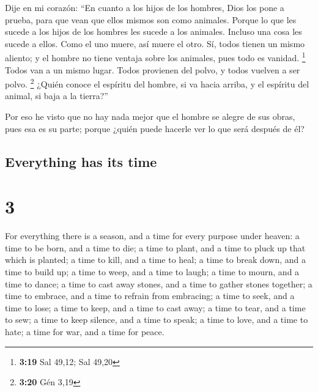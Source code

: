 \begin{paracol}{2}
 Dije en mi corazón: ``En cuanto a los hijos de los
hombres, Dios los pone a prueba, para que vean que ellos mismos son como
animales.  Porque lo que les sucede a los hijos de los
hombres les sucede a los animales. Incluso una cosa les sucede a ellos.
Como el uno muere, así muere el otro. Sí, todos tienen un mismo aliento;
y el hombre no tiene ventaja sobre los animales, pues todo es vanidad.
\footnote{\textbf{3:19} Sal 49,12; Sal 49,20}  Todos van
a un mismo lugar. Todos provienen del polvo, y todos vuelven a ser
polvo. \footnote{\textbf{3:20} Gén 3,19}  ¿Quién conoce
el espíritu del hombre, si va hacia arriba, y el espíritu del animal, si
baja a la tierra?''

 Por eso he visto que no hay nada mejor que el hombre se
alegre de sus obras, pues esa es su parte; porque ¿quién puede hacerle
ver lo que será después de él?

\switchcolumn
\begin{otherlanguage}{english}

\hypertarget{everything-has-its-time}{%
\subsection{Everything has its time}\label{everything-has-its-time}}

\hypertarget{section-5}{%
\section{3}\label{section-5}}

 For everything there is a season, and a time for every
purpose under heaven:  a time to be born, and a time to
die; a time to plant, and a time to pluck up that which is planted;
 a time to kill, and a time to heal; a time to break down,
and a time to build up;  a time to weep, and a time to
laugh; a time to mourn, and a time to dance;  a time to
cast away stones, and a time to gather stones together; a time to
embrace, and a time to refrain from embracing;  a time to
seek, and a time to lose; a time to keep, and a time to cast away;
 a time to tear, and a time to sew; a time to keep
silence, and a time to speak;  a time to love, and a time
to hate; a time for war, and a time for peace.

\hypertarget{but-man-does-not-know-the-time-set-by-god-and-is-powerless-against-it}{%
}
\end{otherlanguage}
\end{paracol}
